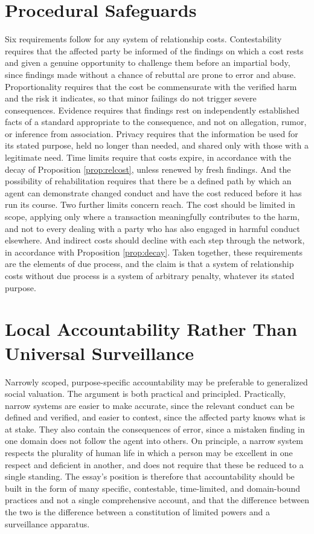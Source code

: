 \documentclass[11pt]{report}
\theoremstyle{definition}
\theoremstyle{remark}
\begin{document}
\section{Procedural Safeguards}

Six requirements follow for any system of relationship costs. Contestability requires that the affected party be informed of the findings on which a cost rests and given a genuine opportunity to challenge them before an impartial body, since findings made without a chance of rebuttal are prone to error and abuse. Proportionality requires that the cost be commensurate with the verified harm and the risk it indicates, so that minor failings do not trigger severe consequences. Evidence requires that findings rest on independently established facts of a standard appropriate to the consequence, and not on allegation, rumor, or inference from association. Privacy requires that the information be used for its stated purpose, held no longer than needed, and shared only with those with a legitimate need. Time limits require that costs expire, in accordance with the decay of Proposition \ref{prop:relcost}, unless renewed by fresh findings. And the possibility of rehabilitation requires that there be a defined path by which an agent can demonstrate changed conduct and have the cost reduced before it has run its course. Two further limits concern reach. The cost should be limited in scope, applying only where a transaction meaningfully contributes to the harm, and not to every dealing with a party who has also engaged in harmful conduct elsewhere. And indirect costs should decline with each step through the network, in accordance with Proposition \ref{prop:decay}. Taken together, these requirements are the elements of due process, and the claim is that a system of relationship costs without due process is a system of arbitrary penalty, whatever its stated purpose.

\section{Local Accountability Rather Than Universal Surveillance}

Narrowly scoped, purpose-specific accountability may be preferable to generalized social valuation. The argument is both practical and principled. Practically, narrow systems are easier to make accurate, since the relevant conduct can be defined and verified, and easier to contest, since the affected party knows what is at stake. They also contain the consequences of error, since a mistaken finding in one domain does not follow the agent into others. On principle, a narrow system respects the plurality of human life in which a person may be excellent in one respect and deficient in another, and does not require that these be reduced to a single standing. The essay's position is therefore that accountability should be built in the form of many specific, contestable, time-limited, and domain-bound practices and not a single comprehensive account, and that the difference between the two is the difference between a constitution of limited powers and a surveillance apparatus.
\end{document}
